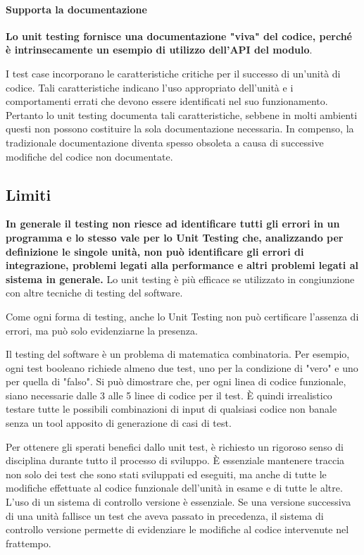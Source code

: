 \documentclass[11pt,a4paper]{book}
\begin{document}
\paragraph{Supporta la documentazione}
\textbf{Lo unit testing fornisce una documentazione "viva" del codice, perché è intrinsecamente un esempio di utilizzo dell'API del modulo}.

I test case incorporano le caratteristiche critiche per il successo di un'unità di codice. Tali caratteristiche indicano l'uso appropriato dell'unità e i comportamenti errati che devono essere identificati nel suo funzionamento. Pertanto lo unit testing documenta tali caratteristiche, sebbene in molti ambienti questi non possono costituire la sola documentazione necessaria. In compenso, la tradizionale documentazione diventa spesso obsoleta a causa di successive modifiche del codice non documentate.

\subsection{Limiti}
\textbf{In generale il testing non riesce ad identificare tutti gli errori in un programma e lo stesso vale per lo Unit Testing che, analizzando per definizione le singole unità, non può identificare gli errori di integrazione, problemi legati alla performance e altri problemi legati al sistema in generale.} Lo unit testing è più efficace se utilizzato in congiunzione con altre tecniche di testing del software.

Come ogni forma di testing, anche lo Unit Testing non può certificare l'assenza di errori, ma può solo evidenziarne la presenza.

Il testing del software è un problema di matematica combinatoria. Per esempio, ogni test booleano richiede almeno due test, uno per la condizione di "vero" e uno per quella di "falso". Si può dimostrare che, per ogni linea di codice funzionale, siano necessarie dalle 3 alle 5 linee di codice per il test. È quindi irrealistico testare tutte le possibili combinazioni di input di qualsiasi codice non banale senza un tool apposito di generazione di casi di test.

Per ottenere gli sperati benefici dallo unit test, è richiesto un rigoroso senso di disciplina durante tutto il processo di sviluppo. È essenziale mantenere traccia non solo dei test che sono stati sviluppati ed eseguiti, ma anche di tutte le modifiche effettuate al codice funzionale dell'unità in esame e di tutte le altre. L'uso di un sistema di controllo versione è essenziale. Se una versione successiva di una unità fallisce un test che aveva passato in precedenza, il sistema di controllo versione permette di evidenziare le modifiche al codice intervenute nel frattempo.
\end{document}
